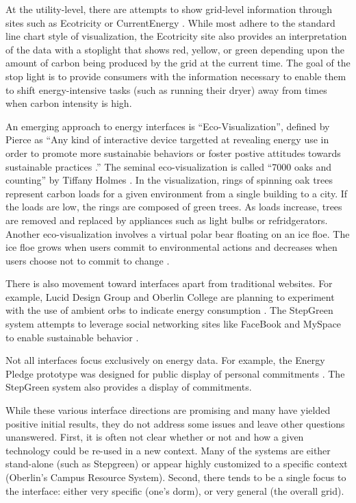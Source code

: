 At the utility-level, there are attempts to show grid-level information
through sites such as Ecotricity \cite{Ecotricity} or CurrentEnergy
\cite{CurrentEnergy}.  While most adhere to the standard line chart style
of visualization, the Ecotricity site also provides an interpretation of
the data with a stoplight that shows red, yellow, or green depending upon
the amount of carbon being produced by the grid at the current time.  The
goal of the stop light is to provide consumers with the information
necessary to enable them to shift energy-intensive tasks (such as running
their dryer) away from times when carbon intensity is high.

An emerging approach to energy interfaces is ``Eco-Visualization'',
defined by Pierce as ``Any kind of interactive device targetted at
revealing energy use in order to promote more sustainabie behaviors or
foster postive attitudes towards sustainable practices \cite{Pierce08}.''
The seminal eco-visualization is called ``7000 oaks and counting'' by
Tiffany Holmes \cite{Holmes07}.  In the visualization, rings of spinning
oak trees represent carbon loads for a given environment from a single
building to a city.  If the loads are low, the rings are composed of green
trees. As loads increase, trees are removed and replaced by appliances such
as light bulbs or refridgerators.  Another eco-visualization involves a
virtual polar bear floating on an ice floe. The ice floe grows when users
commit to environmental actions and decreases when users choose not to
commit to change \cite{Dillahunt08}.

There is also movement toward interfaces apart from traditional
websites.  For example, Lucid Design Group and Oberlin College are
planning to experiment with the use of ambient orbs to indicate energy
consumption \cite{Peterson09}.  The StepGreen system attempts to 
leverage social networking sites like FaceBook and MySpace to enable sustainable
behavior \cite{Mankoff07}. 

Not all interfaces focus exclusively on energy data.  For example, the
Energy Pledge prototype was designed for public display of personal
commitments \cite{Pierce09}.  The StepGreen system also provides a display
of commitments.  

While these various interface directions are promising and many have
yielded positive initial results, they do not address some issues and leave
other questions unanswered. First, it is often not clear whether or not and
how a given technology could be re-used in a new context.  Many of the
systems are either stand-alone (such as Stepgreen) or appear highly
customized to a specific context (Oberlin's Campus Resource
System). Second, there tends to be a single focus to the interface: either
very specific (one's dorm), or very general (the overall grid).  

